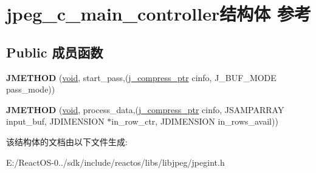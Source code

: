 \hypertarget{structjpeg__c__main__controller}{}\section{jpeg\+\_\+c\+\_\+main\+\_\+controller结构体 参考}
\label{structjpeg__c__main__controller}
\subsection*{Public 成员函数}
\begin{DoxyCompactItemize}
\item 
\mbox{\label{structjpeg__c__main__controller_a12d7c719a1598e04dafbddc0c3d6c1d5}} 
{\bfseries J\+M\+E\+T\+H\+OD} (\hyperlink{interfacevoid}{void}, start\+\_\+pass,(\hyperlink{structjpeg__compress__struct}{j\+\_\+compress\+\_\+ptr} cinfo, J\+\_\+\+B\+U\+F\+\_\+\+M\+O\+DE pass\+\_\+mode))
\item 
\mbox{\label{structjpeg__c__main__controller_aefb0f62e18af1d6087803ac65bfd9bb9}} 
{\bfseries J\+M\+E\+T\+H\+OD} (\hyperlink{interfacevoid}{void}, process\+\_\+data,(\hyperlink{structjpeg__compress__struct}{j\+\_\+compress\+\_\+ptr} cinfo, J\+S\+A\+M\+P\+A\+R\+R\+AY input\+\_\+buf, J\+D\+I\+M\+E\+N\+S\+I\+ON $\ast$in\+\_\+row\+\_\+ctr, J\+D\+I\+M\+E\+N\+S\+I\+ON in\+\_\+rows\+\_\+avail))
\end{DoxyCompactItemize}


该结构体的文档由以下文件生成\+:\begin{DoxyCompactItemize}
\item 
E\+:/\+React\+O\+S-\/0../sdk/include/reactos/libs/libjpeg/jpegint.\+h\end{DoxyCompactItemize}
